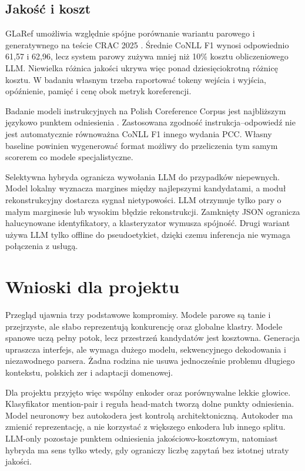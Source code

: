 \subsection{Jakość i koszt}

GLaRef umożliwia względnie spójne porównanie wariantu parowego i generatywnego na teście CRAC 2025 \cite{seminck_2025_glaref}. Średnie CoNLL F1 wynosi odpowiednio 61,57 i 62,96, lecz system parowy zużywa mniej niż 10\% kosztu obliczeniowego LLM. Niewielka różnica jakości ukrywa więc ponad dziesięciokrotną różnicę kosztu. W badaniu własnym trzeba raportować tokeny wejścia i wyjścia, opóźnienie, pamięć i cenę obok metryk koreferencji.

Badanie modeli instrukcyjnych na Polish Coreference Corpus jest najbliższym językowo punktem odniesienia \cite{saputa_2024_pcc_llm}. Zastosowana zgodność instrukcja--odpowiedź nie jest automatycznie równoważna CoNLL F1 innego wydania PCC. Własny baseline powinien wygenerować format możliwy do przeliczenia tym samym scorerem co modele specjalistyczne.

Selektywna hybryda ogranicza wywołania LLM do przypadków niepewnych. Model lokalny wyznacza margines między najlepszymi kandydatami, a moduł rekonstrukcyjny dostarcza sygnał nietypowości. LLM otrzymuje tylko pary o małym marginesie lub wysokim błędzie rekonstrukcji. Zamknięty JSON ogranicza halucynowane identyfikatory, a klasteryzator wymusza spójność. Drugi wariant używa LLM tylko offline do pseudoetykiet, dzięki czemu inferencja nie wymaga połączenia z usługą.

\section{Wnioski dla projektu}
\label{sec:wnioski-przeglad}

Przegląd ujawnia trzy podstawowe kompromisy. Modele parowe są tanie i przejrzyste, ale słabo reprezentują konkurencję oraz globalne klastry. Modele spanowe uczą pełny potok, lecz przestrzeń kandydatów jest kosztowna. Generacja upraszcza interfejs, ale wymaga dużego modelu, sekwencyjnego dekodowania i niezawodnego parsera. Żadna rodzina nie usuwa jednocześnie problemu długiego kontekstu, polskich zer i adaptacji domenowej.

Dla projektu przyjęto więc wspólny enkoder oraz porównywalne lekkie głowice. Klasyfikator mention-pair i reguła head-match tworzą dolne punkty odniesienia. Model neuronowy bez autokodera jest kontrolą architektoniczną. Autokoder ma zmienić reprezentację, a nie korzystać z większego enkodera lub innego splitu. LLM-only pozostaje punktem odniesienia jakościowo-kosztowym, natomiast hybryda ma sens tylko wtedy, gdy ograniczy liczbę zapytań bez istotnej utraty jakości.

